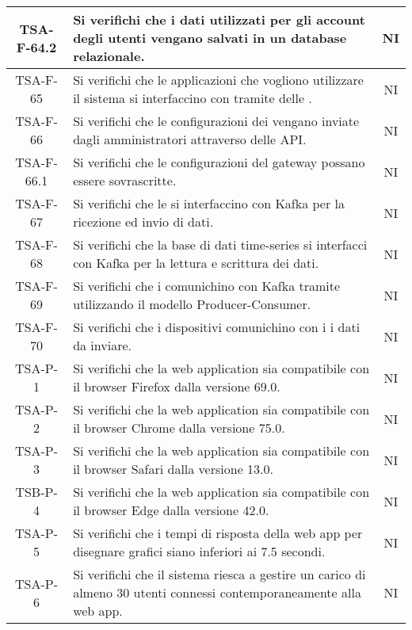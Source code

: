 \begin{center}
\begin{longtable}{|c|p{10cm}|c|}
			 \hline
			 TSA-F-64.2 & Si verifichi che i dati utilizzati per gli account degli utenti vengano salvati in un database relazionale. & NI \\
			 \hline
			 TSA-F-65 & Si verifichi che le applicazioni che vogliono utilizzare il sistema si interfaccino con \glock{Kafka} tramite delle \glock{API}. & NI \\
			 \hline
			 TSA-F-66 & Si verifichi che le configurazioni dei \glock{gateway} vengano inviate dagli amministratori attraverso delle API. & NI \\
			 \hline
			 TSA-F-66.1 & Si verifichi che le configurazioni del gateway possano essere sovrascritte. & NI \\
			 \hline
			 TSA-F-67 & Si verifichi che le \glock{API} si interfaccino con Kafka per la ricezione ed invio di dati. & NI \\
			 \hline
			 TSA-F-68 & Si verifichi che la base di dati time-series si interfacci con Kafka per la lettura e scrittura dei dati. & NI \\
			 \hline
			 TSA-F-69 & Si verifichi che i \glock{gateway} comunichino con Kafka tramite \glock{topic} utilizzando il modello Producer-Consumer. & NI \\
			 \hline
			 TSA-F-70 & Si verifichi che i dispositivi comunichino con i \glock{gateway} i dati da inviare. & NI \\
			 \hline
			 TSA-P-1 & Si verifichi che la web application sia compatibile con il browser Firefox dalla versione 69.0. & NI \\ %
			 \hline
			 TSA-P-2 & Si verifichi che la web application sia compatibile con il browser Chrome dalla versione 75.0. & NI \\
			 \hline
			 TSA-P-3 & Si verifichi che la web application sia compatibile con il browser Safari dalla versione 13.0. & NI \\
			 \hline
			 TSB-P-4 & Si verifichi che la web application sia compatibile con il browser Edge dalla versione 42.0. & NI \\
			 \hline
			 TSA-P-5 & Si verifichi che i tempi di risposta della web app per disegnare grafici siano inferiori ai 7.5 secondi. & NI \\
			 \hline
			 TSA-P-6 & Si verifichi che il sistema riesca a gestire un carico di almeno 30 utenti connessi contemporaneamente alla web app. & NI \\

\end{longtable}
\end{center}

